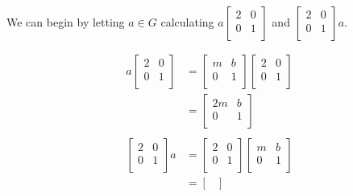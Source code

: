 \begin{mdframed}[style=darkAnswer,frametitle={Joe Starr}]
We can begin by letting $a\in G$ calculating $a\begin{bmatrix}
  2 & 0\\
  0 & 1\\
\end{bmatrix}$ and $\begin{bmatrix}
  2 & 0\\
  0 & 1\\
\end{bmatrix}a$. 
\begin{multicols}{2}
  \begin{align*}
    a\begin{bmatrix}
      2 & 0\\
      0 & 1\\
    \end{bmatrix} & = \begin{bmatrix}
      m & b \\
      0   & 1   \\
    \end{bmatrix} \begin{bmatrix}
      2 & 0\\
      0 & 1\\
    \end{bmatrix} \\
       & = \begin{bmatrix}
      2m & b \\
      0      & 1          \\
    \end{bmatrix}                            \\
  \end{align*}
  \begin{align*}
    \begin{bmatrix}
      2 & 0\\
      0 & 1\\
    \end{bmatrix}a & =  \begin{bmatrix}
      2 & 0\\
      0 & 1\\
    \end{bmatrix} \begin{bmatrix}
      m & b \\
      0   & 1   \\
    \end{bmatrix}\\
       & = \begin{bmatrix}

\end{bmatrix}
\end{align*}
\end{multicols}
\end{mdframed}
